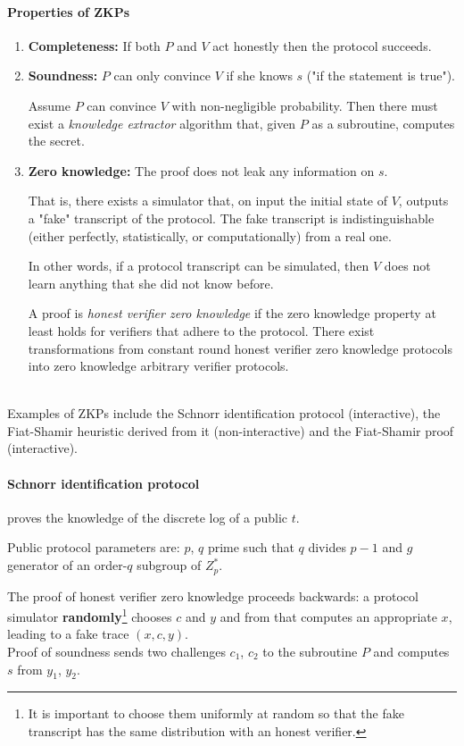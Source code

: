 \paragraph{Properties of ZKPs}
\begin{enumerate}
    \item \textbf{Completeness:} If both $P$ and $V$ act honestly then the protocol succeeds.
        
    \item \textbf{Soundness:} $P$ can only convince $V$ if she knows $s$ ("if the statement is true").

    Assume $P$ can convince $V$ with non-negligible probability. Then there must exist a \textit{knowledge extractor} algorithm that, given $P$ as a subroutine, computes the secret.
    
    \item \textbf{Zero knowledge:} The proof does not leak any information on $s$.
    
    That is, there exists a simulator that, on input the initial state of $V$, outputs a "fake" transcript of the protocol. The fake transcript is indistinguishable (either perfectly, statistically, or computationally) from a real one.
    
    In other words, if a protocol transcript can be simulated, then $V$ does not learn anything that she did not know before.

    A proof is \textit{honest verifier zero knowledge} if the zero knowledge property at least holds for verifiers that adhere to the protocol. There exist transformations from constant round honest verifier zero knowledge protocols into zero knowledge arbitrary verifier protocols.
\end{enumerate}
\mbox{} \\

Examples of ZKPs include the Schnorr identification protocol (interactive), the Fiat-Shamir heuristic derived from it  (non-interactive) and the Fiat-Shamir proof (interactive).

\paragraph{Schnorr identification protocol} proves the knowledge of the discrete log of a public $t$.

Public protocol parameters are: $p$, $q$  prime such that $q$ divides $p-1$ and $g$ generator of an order-$q$ subgroup of $Z_p^*$.

The proof of honest verifier zero knowledge proceeds backwards: a protocol simulator \textbf{randomly}\footnote{It is important to choose them uniformly at random so that the fake transcript has the same distribution with an honest verifier.} chooses $c$ and $y$ and from that computes an appropriate $x$, leading to a fake trace $(x,c,y)$.\\
Proof of soundness sends two challenges $c_1$, $c_2$ to the subroutine $P$ and computes $s$ from $y_1$, $y_2$.

